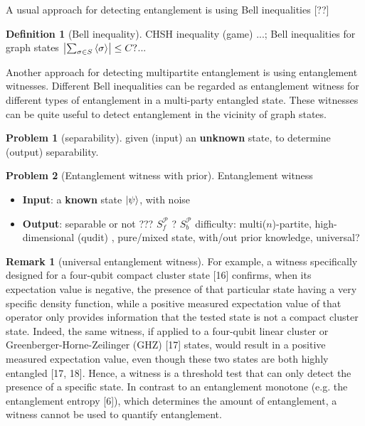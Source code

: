\documentclass[
10pt,
aps,
pra,
linenumbers,
floatfix,
]{revtex4-2}
\theoremstyle{plain}
\theoremstyle{definition}
\newtheorem{definition}{Definition}
\newtheorem{remark}{Remark}
\newtheorem{problem}{Problem}
\newcommand{\separable}{S}
\newcommand{\ppartition}{\mathcal{P}}
\begin{document}
A usual approach for detecting entanglement is using Bell inequalities [??]
\begin{definition}[Bell inequality]\label{def:bell_inequality}
	CHSH inequality (game) ...;
	Bell inequalities for graph states $\abs{\sum_{\sigma\in S} \expval{\sigma}}\le C?$...
\end{definition}
Another approach for detecting multipartite entanglement is using entanglement witnesses.
Different Bell inequalities can be regarded as entanglement witness for different types of entanglement in a multi-party entangled state.
These witnesses can be quite useful to detect entanglement in the vicinity of graph states.
\begin{problem}[separability]\label{prm:separable}
	given (input) an \textbf{unknown} state, to determine (output) separability.
\end{problem}
\begin{problem}[Entanglement witness with prior]
	Entanglement witness	
		\begin{itemize}
		\item \textbf{Input}: a \textbf{known} state $\ket{\psi}$, with noise
		\item \textbf{Output}: separable or not ??? $\separable_f^\ppartition$ ? $\separable_b^\ppartition$ 
		difficulty: multi($n$)-partite, high-dimensional (qudit) \cite{sciaraUniversalPartiteLevel2019}, pure/mixed state, with/out prior knowledge, universal?
	\end{itemize}
\end{problem}
\begin{remark}[universal entanglement witness]
	\cite{sciaraUniversalPartiteLevel2019}
	For example, a witness specifically designed for a four-qubit compact cluster state [16] conﬁrms, when its expectation value is negative, the presence of that particular state having a very speciﬁc density function, while a positive measured expectation value of that operator only provides information that the tested state is not a compact cluster state. Indeed, the same witness, if applied to a four-qubit linear cluster or Greenberger-Horne-Zeilinger (GHZ) [17] states, would result in a positive measured expectation value, even though these two states are both highly entangled [17, 18]. 
	Hence, a witness is a threshold test that can only detect the presence of a speciﬁc state. 
	In contrast to an entanglement monotone (e.g. the entanglement entropy [6]), which determines the amount of entanglement, a witness cannot be used to quantify entanglement.	
\end{remark}
\end{document}
